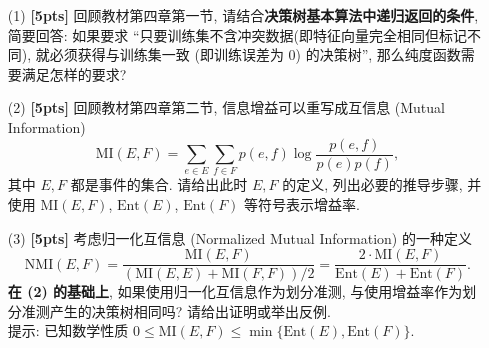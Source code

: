 \documentclass[a4paper]{article}
\numberwithin{equation}{section}
\theoremstyle{definition}
\newcommand\sbr[1]{\left( #1 \right)}
\begin{document}
\begin{enumerate}
	\item[(1)] \textbf{[5pts]} 回顾教材第四章第一节, 请结合\textbf{决策树基本算法中递归返回的条件}, 简要回答: 如果要求 ``只要训练集不含冲突数据(即特征向量完全相同但标记不同), 就必须获得与训练集一致 (即训练误差为 $0$) 的决策树'', 那么纯度函数需要满足怎样的要求?
	\item[(2)] \textbf{[5pts]} 回顾教材第四章第二节, 信息增益可以重写成互信息 (Mutual Information)
	      $$\mathrm{MI}(E,F) = \sum_{e \in E} \sum_{f \in F} p(e,f) \log \frac{p(e,f)}{p(e)p(f)},$$
	      其中 $E,F$ 都是事件的集合. 请给出此时 $E,F$ 的定义, 列出必要的推导步骤, 并使用 $\mathrm{MI}(E,F)$, $\mathrm{Ent}(E)$, $\mathrm{Ent}(F)$ 等符号表示增益率.
	\item[(3)] \textbf{[5pts]} 考虑归一化互信息 (Normalized Mutual Information) 的一种定义
	      $$\mathrm{NMI}(E,F) = \frac{\mathrm{MI}(E,F)}{\sbr{\mathrm{MI}(E,E) + \mathrm{MI}(F,F)} / 2} = \frac{2 \cdot \mathrm{MI}(E,F)}{\mathrm{Ent}(E) + \mathrm{Ent}(F)}.$$
	      \textbf{在 (2) 的基础上}, 如果使用归一化互信息作为划分准测, 与使用增益率作为划分准测产生的决策树相同吗? 请给出证明或举出反例. \\
	      提示: 已知数学性质 $0 \leqslant \mathrm{MI}(E,F) \leqslant \min\{\mathrm{Ent}(E), \mathrm{Ent}(F)\}$.
\end{enumerate}
\end{document}
